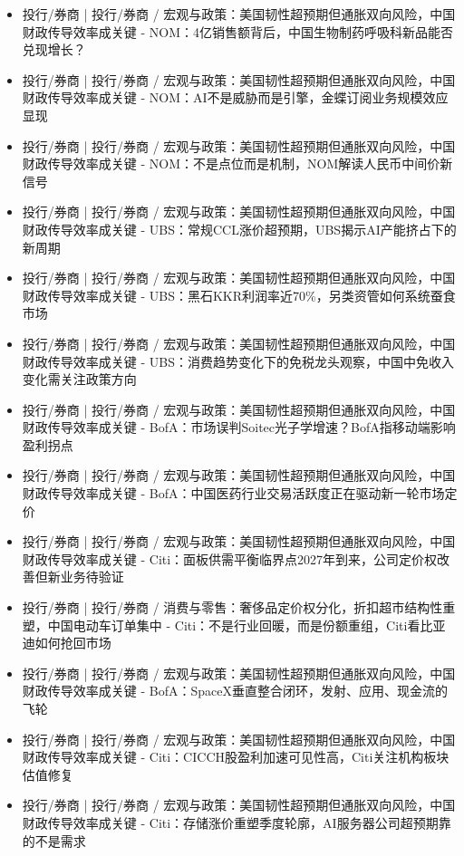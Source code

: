 \documentclass[11pt]{ctexart}
\begin{document}
\begin{itemize}
  \item [R041] 投行/券商 | 投行/券商 / 宏观与政策：美国韧性超预期但通胀双向风险，中国财政传导效率成关键 - NOM：4亿销售额背后，中国生物制药呼吸科新品能否兑现增长？
  \item [R042] 投行/券商 | 投行/券商 / 宏观与政策：美国韧性超预期但通胀双向风险，中国财政传导效率成关键 - NOM：AI不是威胁而是引擎，金蝶订阅业务规模效应显现
  \item [R043] 投行/券商 | 投行/券商 / 宏观与政策：美国韧性超预期但通胀双向风险，中国财政传导效率成关键 - NOM：不是点位而是机制，NOM解读人民币中间价新信号
  \item [R044] 投行/券商 | 投行/券商 / 宏观与政策：美国韧性超预期但通胀双向风险，中国财政传导效率成关键 - UBS：常规CCL涨价超预期，UBS揭示AI产能挤占下的新周期
  \item [R045] 投行/券商 | 投行/券商 / 宏观与政策：美国韧性超预期但通胀双向风险，中国财政传导效率成关键 - UBS：黑石KKR利润率近70\%，另类资管如何系统蚕食市场
  \item [R046] 投行/券商 | 投行/券商 / 宏观与政策：美国韧性超预期但通胀双向风险，中国财政传导效率成关键 - UBS：消费趋势变化下的免税龙头观察，中国中免收入变化需关注政策方向
  \item [R047] 投行/券商 | 投行/券商 / 宏观与政策：美国韧性超预期但通胀双向风险，中国财政传导效率成关键 - BofA：市场误判Soitec光子学增速？BofA指移动端影响盈利拐点
  \item [R048] 投行/券商 | 投行/券商 / 宏观与政策：美国韧性超预期但通胀双向风险，中国财政传导效率成关键 - BofA：中国医药行业交易活跃度正在驱动新一轮市场定价
  \item [R049] 投行/券商 | 投行/券商 / 宏观与政策：美国韧性超预期但通胀双向风险，中国财政传导效率成关键 - Citi：面板供需平衡临界点2027年到来，公司定价权改善但新业务待验证
  \item [R050] 投行/券商 | 投行/券商 / 消费与零售：奢侈品定价权分化，折扣超市结构性重塑，中国电动车订单集中 - Citi：不是行业回暖，而是份额重组，Citi看比亚迪如何抢回市场
  \item [R051] 投行/券商 | 投行/券商 / 宏观与政策：美国韧性超预期但通胀双向风险，中国财政传导效率成关键 - BofA：SpaceX垂直整合闭环，发射、应用、现金流的飞轮
  \item [R052] 投行/券商 | 投行/券商 / 宏观与政策：美国韧性超预期但通胀双向风险，中国财政传导效率成关键 - Citi：CICCH股盈利加速可见性高，Citi关注机构板块估值修复
  \item [R053] 投行/券商 | 投行/券商 / 宏观与政策：美国韧性超预期但通胀双向风险，中国财政传导效率成关键 - Citi：存储涨价重塑季度轮廓，AI服务器公司超预期靠的不是需求

\end{itemize}
\end{document}
